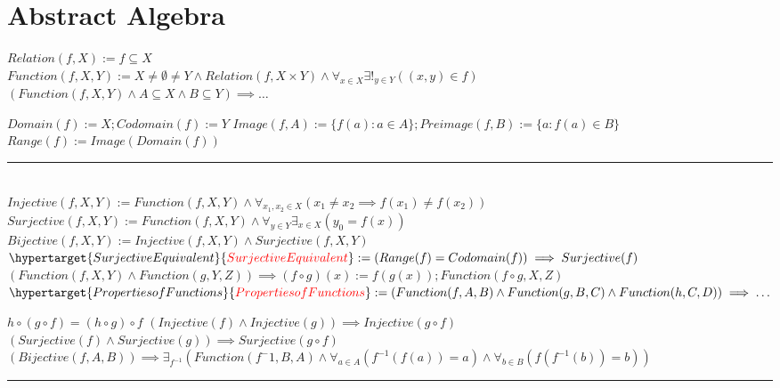 \documentclass{book}
\newcommand{\df}[1]{\hypertarget{#1}{\textcolor{red}{#1}}}
\newcommand{\abr}{:=}
\begin{document}
\chapter{Abstract Algebra}
$Relation(f, X) \abr f \subseteq X$ \\
$Function(f, X, Y) \abr X \neq \emptyset \neq Y \land Relation(f, X \times Y) \land \forall_{x \in X} \exists!_{y \in Y}((x, y) \in f)$ \\

$(Function(f, X, Y) \land A \subseteq X \land B \subseteq Y) \implies \ldots$
\begin{enumerate}
  \lit $Domain(f) \abr X; Codomain(f) \abr Y$ %
  \lit $Image(f, A) \abr \{f(a) : a \in A\}; Preimage(f, B) \abr \{a : f(a) \in B\}$
  \lit $Range(f) \abr Image(Domain(f))$
\end{enumerate} \vspace{.75mm} \hrule \vspace{.75mm} \ \\ 

$Injective(f, X, Y) \abr Function(f, X, Y) \land \forall_{x_1, x_2 \in X}(x_1 \neq x_2 \implies f(x_1) \neq f(x_2))$ \\ %
$Surjective(f, X, Y) \abr Function(f, X, Y) \land \forall_{y \in Y} \exists_{x \in X}(y_0 = f(x))$ \\ %
$Bijective(f, X, Y) \abr Injective(f, X, Y) \land Surjective(f, X, Y)$ \\ %
$\df{Surjective Equivalent} \abr (Range(f) = Codomain(f)) \implies Surjective(f)$ \\

$(Function(f, X, Y) \land Function(g, Y, Z)) \implies (f \circ g)(x) \abr f(g(x)); Function(f \circ g, X, Z)$ \\

$\df{Properties of Functions} \abr (Function(f, A, B) \land Function(g, B, C) \land Function(h, C, D)) \implies \ldots$
\begin{enumerate}
  \lit $h \circ (g \circ f) = (h \circ g) \circ f$
  \lit $(Injective(f) \land Injective(g)) \implies Injective(g \circ f)$
  \lit $(Surjective(f) \land Surjective(g)) \implies Surjective(g \circ f)$
  \lit $(Bijective(f, A, B)) \implies \exists_{f^{-1}}(Function(f^-1, B, A) \land \forall_{a \in A}(f^{-1}(f(a)) = a) \land \forall_{b \in B}(f(f^{-1}(b)) = b))$
\end{enumerate} \vspace{.75mm} \hrule \vspace{.75mm} \ \\ 
\end{document}
